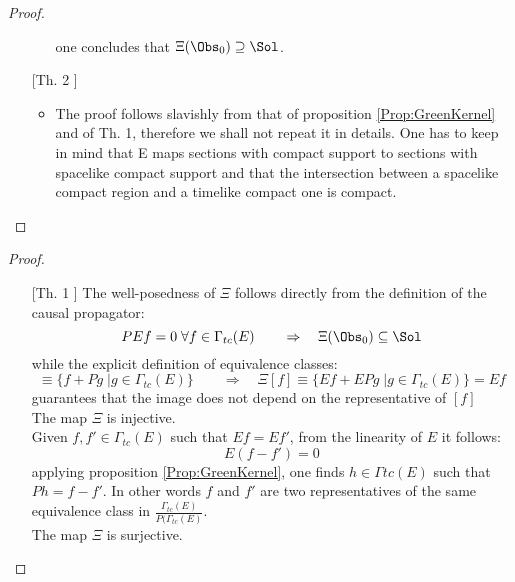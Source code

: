 \documentclass[Main]{subfiles}
\begin{document}
\begin{proof}
\begin{itemize}
\begin{itemize}
						one concludes that $\Xi ( \Obs_0) \supseteq \Sol$.
				\end{itemize}
			\item[	[Th. 2]]
				\begin{itemize}
					\item The proof follows slavishly from that of proposition \ref{Prop:GreenKernel} and of Th. 1, therefore we shall not repeat it in details.
						One has %
						to keep in mind that E maps sections with compact support to sections with spacelike compact support and that the intersection between a spacelike compact region and a timelike compact one is compact.
				\end{itemize}
		\end{itemize}
	\end{proof}
\else
	\begin{proof}
		\forcenewline
		\begin{itemize}
			\item[	[Th. 1]]
					 The well-posedness of $\Xi$ follows directly from the definition of the causal propagator:
						\begin{displaymath}
							P E f = 0 \; \forall f \in \Gamma_{tc}(E) \qquad \Rightarrow \quad \Xi ( \Obs_0) \subseteq \Sol
						\end{displaymath}
						while the explicit definition of equivalence classes:
						\begin{displaymath}
							[f] \equiv \{ f + P g \; \vert g \in \Gamma_{tc}(E)\} \qquad\Rightarrow \quad
							 \Xi [f] \equiv \{ E f + E P g \;\vert g \in \Gamma_{tc}(E)\} = E f
						\end{displaymath}
						guarantees that the image does not depend on the representative of $[f]$
					\vspace{2mm} \\  %
						The map $\Xi$ is injective.\\
						Given $f , f' \in \Gamma_{tc}(E)$ such that $E f = E f'$, from the linearity of $E$ it follows:
						\begin{displaymath}
							E ( f - f') = 0
						\end{displaymath}
						applying proposition \ref{Prop:GreenKernel}, one finds $h \in \Gamma{tc}(E)$ such that $P h = f - f'$.
						In other words $f$ and $f'$  are two representatives of the same equivalence class in $\frac{\Gamma_{tc}(E)}{P ( \Gamma_{tc}(E)} $.
					\vspace{2mm} \\  The map $\Xi$ is surjective.\\

\end{itemize}
\end{proof}
\end{document}
